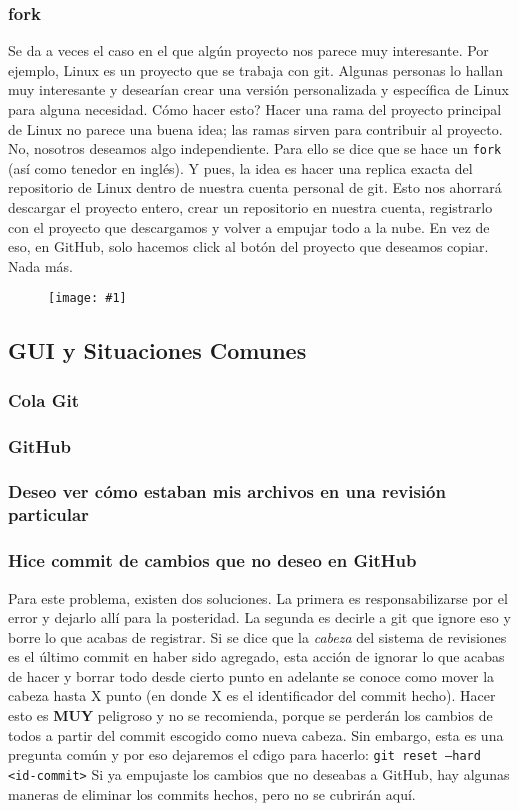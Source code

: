 \documentclass[10pt,letterpaper]{article}
\newcommand{\inlinecode}[1]{
\colorbox{light-gray}{\texttt{#1}}
}
\newcommand{\Picture}[1]
{
	\begin{figure}[H]
	\begin{flushleft}
	\texttt{[image: \#1]}
	\end{flushleft}
	\end{figure}
}
\begin{document}
\subsubsection{fork}
Se da a veces el caso en el que alg\'un proyecto nos parece muy interesante. Por ejemplo, Linux es un proyecto que se trabaja con git. Algunas personas lo hallan muy interesante y desear\'ian crear una versi\'on personalizada y espec\'ifica de Linux para alguna necesidad. C\'omo hacer esto? Hacer una rama del proyecto principal de Linux no parece una buena idea; las ramas sirven para contribuir al proyecto. No, nosotros deseamos algo independiente. Para ello se dice que se hace un \inlinecode{fork} (as\'i como tenedor en ingl\'es). Y pues, la idea es hacer una replica exacta del repositorio de Linux dentro de nuestra cuenta personal de git. Esto nos ahorrar\'a descargar el proyecto entero, crear un repositorio en nuestra cuenta, registrarlo con el proyecto que descargamos y volver a empujar todo a la nube. En vez de eso, en GitHub, solo hacemos click al bot\'on del proyecto que deseamos copiar. Nada m\'as.

\Picture{img/fork.png}

\subsection{GUI y Situaciones Comunes}

\subsubsection{Cola Git}

\subsubsection{GitHub}

\subsubsection{Deseo ver c\'omo estaban mis archivos en una revisi\'on particular}

\subsubsection{Hice commit de cambios que no deseo en GitHub}
Para este problema, existen dos soluciones. La primera es responsabilizarse por el error y dejarlo all\'i para la posteridad. La segunda es decirle a git que ignore eso y borre lo que acabas de registrar. Si se dice que la \emph{cabeza} del sistema de revisiones es el \'ultimo commit en haber sido agregado, esta acci\'on de ignorar lo que acabas de hacer y borrar todo desde cierto punto en adelante se conoce como mover la cabeza hasta X punto (en donde X es el identificador del commit hecho). Hacer esto es \textbf{MUY} peligroso y no se recomienda, porque se perder\'an los cambios de todos a partir del commit escogido como nueva cabeza. Sin embargo, esta es una pregunta com\'un y por eso dejaremos el c\'digo para hacerlo: \inlinecode{git reset --hard <id-commit>} Si ya empujaste los cambios que no deseabas a GitHub, hay algunas maneras de eliminar los commits hechos, pero no se cubrir\'an aqu\'i.
\end{document}
